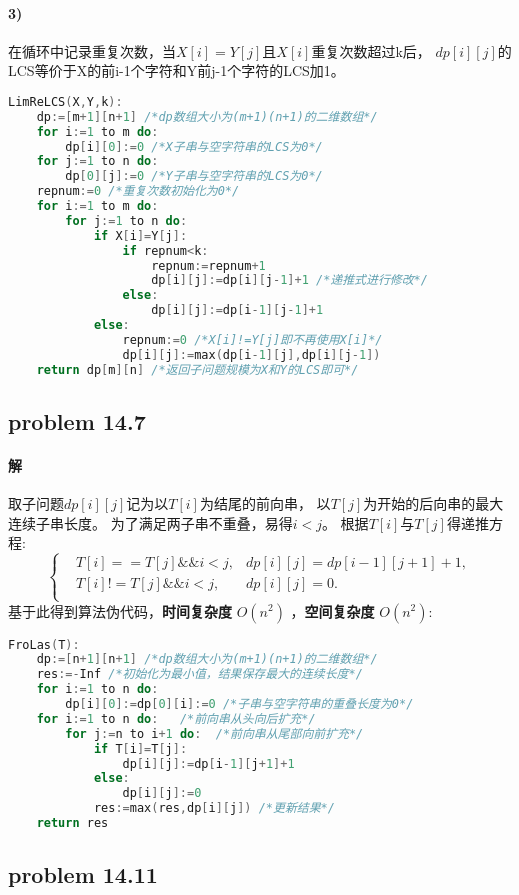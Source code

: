 \documentclass[11pt,a4paper,oneside,oldfontcommands]{ctexart}
\begin{document}
\paragraph*{3)}
在循环中记录重复次数，当$X[i]=Y[j]$且$X[i]$重复次数超过k后，
$dp[i][j]$的LCS等价于X的前i-1个字符和Y前j-1个字符的LCS加1。
\begin{lstlisting}[language=C++,title=LimReLCS.func]
LimReLCS(X,Y,k):
	dp:=[m+1][n+1] /*dp数组大小为(m+1)(n+1)的二维数组*/
	for i:=1 to m do:
		dp[i][0]:=0 /*X子串与空字符串的LCS为0*/
	for j:=1 to n do:
		dp[0][j]:=0 /*Y子串与空字符串的LCS为0*/
	repnum:=0 /*重复次数初始化为0*/
	for i:=1 to m do:
		for j:=1 to n do:
			if X[i]=Y[j]:
				if repnum<k:
					repnum:=repnum+1
					dp[i][j]:=dp[i][j-1]+1 /*递推式进行修改*/
				else:
					dp[i][j]:=dp[i-1][j-1]+1
			else:
				repnum:=0 /*X[i]!=Y[j]即不再使用X[i]*/
				dp[i][j]:=max(dp[i-1][j],dp[i][j-1])
	return dp[m][n] /*返回子问题规模为X和Y的LCS即可*/
\end{lstlisting}
\newpage
\hypertarget{14.7}{\subsection*{problem 14.7}}
\paragraph*{解}取子问题$dp[i][j]$记为以$T[i]$为结尾的前向串，
以$T[j]$为开始的后向串的最大连续子串长度。
为了满足两子串不重叠，易得$i<j$。
根据$T[i]$与$T[j]$得递推方程:
$$\left\{
	\begin{aligned}
		&T[i]==T[j]\&\&i<j,&dp[i][j]=dp[i-1][j+1]+1,\\
		&T[i]!=T[j]\&\&i<j,&dp[i][j]=0.\\
	\end{aligned}
\right.
$$
基于此得到算法伪代码，\textbf{时间复杂度} $O(n^2)$
，\textbf{空间复杂度} $O(n^2)$:
\begin{lstlisting}[language=C++,title=FroLas.func]
FroLas(T):
	dp:=[n+1][n+1] /*dp数组大小为(m+1)(n+1)的二维数组*/
	res:=-Inf /*初始化为最小值，结果保存最大的连续长度*/
 	for i:=1 to n do:
		dp[i][0]:=dp[0][i]:=0 /*子串与空字符串的重叠长度为0*/
	for i:=1 to n do:   /*前向串从头向后扩充*/
		for j:=n to i+1 do:  /*前向串从尾部向前扩充*/
			if T[i]=T[j]:
				dp[i][j]:=dp[i-1][j+1]+1
			else:
				dp[i][j]:=0
			res:=max(res,dp[i][j]) /*更新结果*/
	return res
\end{lstlisting}
{\subsection*{problem 14.11}}
\end{document}
